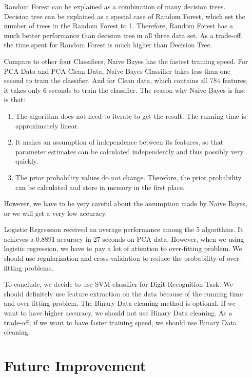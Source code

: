 \documentclass[sigconf]{acmart}
\begin{document}
Random Forest can be explained as a combination of many decision trees. Decision tree can be explained as a special case of Random Forest, which set the number of trees in the Random Forest to 1. Therefore, Random Forest has a much better performance than decision tree in all three data set. As a trade-off, the time spent for Random Forest is much higher than Decision Tree.

Compare to other four Classifiers, Naive Bayes has the fastest training speed. For PCA Data and PCA Clean Data, Naive Bayes Classifier takes less than one second to train the classifier. And for Clean data, which contains all 784 features, it takes only 6 seconds to train the classifier. The reason why Naive Bayes is fast is that:

\begin{enumerate}
    \item The algorithm does not need to iterate to get the result. The running time is approximately linear.
    \item It makes an assumption of independence between its features, so that parameter estimates can be calculated independently and thus possibly very quickly.
    \item The prior probability values do not change. Therefore, the prior probability can be calculated and store in memory in the first place. 
\end{enumerate}

However, we have to be very careful about the assumption made by Naive Bayes, or we will get a very low accuracy.

Logistic Regression received an average performance among the 5 algorithms. It achieves a 0.8891 accuracy in 27 seconds on PCA data. However, when we using logistic regression, we have to pay a lot of attention to over-fitting problem. We should use regularization and cross-validation to reduce the probability of over-fitting problems.

To conclude, we decide to use SVM classifier for Digit Recognition Task. We should definitely use feature extraction on the data because of the running time and over-fitting problem. The Binary Data cleaning method is optional. If we want to have higher accuracy, we should not use Binary Data cleaning. As a trade-off, if we want to have faster training speed, we should use Binary Data cleaning.

\section{Future Improvement}
\end{document}
